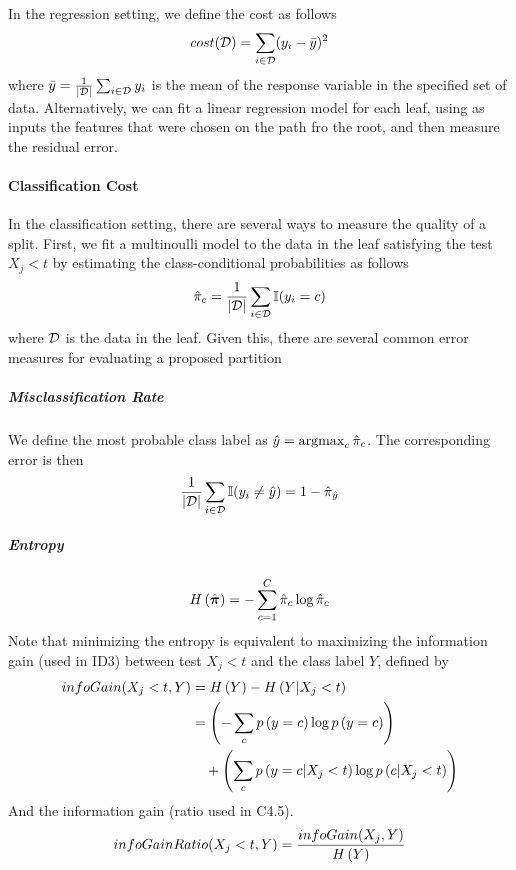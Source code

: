 In the regression setting, we define the cost as follows
\begin{align*}
cost(\mathcal{D})=\sum_{i\in\mathcal{D}}(y_i-\bar{y})^2
\end{align*}
where $\bar{y}=\frac{1}{\left\vert\mathcal{D}\right\vert}\sum_{i\in\mathcal{D}}y_i$ is the mean of the response variable in the specified set of data. Alternatively, we can fit a linear regression model for each leaf, using as inputs the features that were chosen on the path fro the root, and then measure the residual error.

\paragraph{Classification Cost}

In the classification setting, there are several ways to measure the quality of a split. First, we fit a multinoulli model to the data in the leaf satisfying the test $X_j<t$ by estimating the class-conditional probabilities as follows
\begin{align*}
\hat{\pi}_c=\frac{1}{\left\vert\mathcal{D}\right\vert}\sum_{i\in\mathcal{D}}\mathbb{I}(y_i=c)
\end{align*}
where $\mathcal{D}$ is the data in the leaf. Given this, there are several common error measures for evaluating a proposed partition

\subparagraph{Misclassification Rate}

We define the most probable class label as $\hat{y}=\argmax_c\hat{\pi}_c$. The corresponding error is then
\begin{align*}
\frac{1}{\left\vert\mathcal{D}\right\vert}\sum_{i\in\mathcal{D}}\mathbb{I}(y_i\neq\hat{y})=1-\hat{\pi}_{\hat{y}}
\end{align*}

\subparagraph{Entropy}

\begin{align*}
H\left(\hat{\boldsymbol{\pi}}\right)=-\sum_{c=1}^C\hat{\pi}_c\log\hat{\pi}_c
\end{align*}
Note that minimizing the entropy is equivalent to maximizing the information gain (used in ID3) between test $X_j<t$ and the class label $Y$, defined by
\begin{align*}
infoGain(X_j<t,Y)&=H\left(Y\right)-H\left(Y|X_j<t\right) \\
&=\left(-\sum_cp\left(y=c\right)\log p\left(y=c\right)\right) \\
&\quad+\left(\sum_cp\left(y=c|X_j<t\right)\log p\left(c|X_j<t\right)\right)
\end{align*}
And the information gain (ratio used in C4.5).
\begin{align*}
infoGainRatio(X_j<t,Y)=\frac{infoGain(X_j,Y)}{H\left(Y\right)}
\end{align*}

